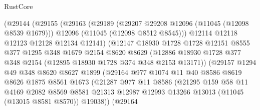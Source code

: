 \begin{lexlean}{RustCore}
\begin{coremodule}
                    (@29144
                      (@29155
                        (@29163
                          (@29189
                            (@29207 @29208 @12096 (@11045 (@12098 @8539 @1679)))
                            @12096
                            (@11045 (@12098 @8512 @8545)))
                          @12114
                          @12118
                          @12123
                          @12128
                          @12134
                          @12141)
                        (@12147
                          @18930
                          @1728
                          @1728
                          @12151
                          @8555
                          @377
                          @1295
                          @348
                          @1679
                          @2154
                          @8620
                          @8629
                          (@12886
                            @18930
                            @1728
                            @377
                            @348
                            @2154
                            (@12895 @18930 @1728 @374 @348 @2153 @13171))
                          (@29157
                            @1294
                            @49
                            @348
                            @8620
                            @8627
                            @1899
                            (@29164
                              @977
                              @1074
                              @11
                              @40
                              @8586
                              @8619
                              @8626
                              @1875
                              @8561
                              @1673
                              (@21287
                                @977
                                @11
                                @8586
                                (@21295
                                  @159
                                  @58
                                  @11
                                  @4169
                                  @2082
                                  @8569
                                  @8581
                                  @21313
                                  @12987
                                  @12993
                                  @13266
                                  @13013
                                  (@11045 (@13015 @8581 @8570))
                                  @19038))
                              (@29164

\end{coremodule}
\end{lexlean}
